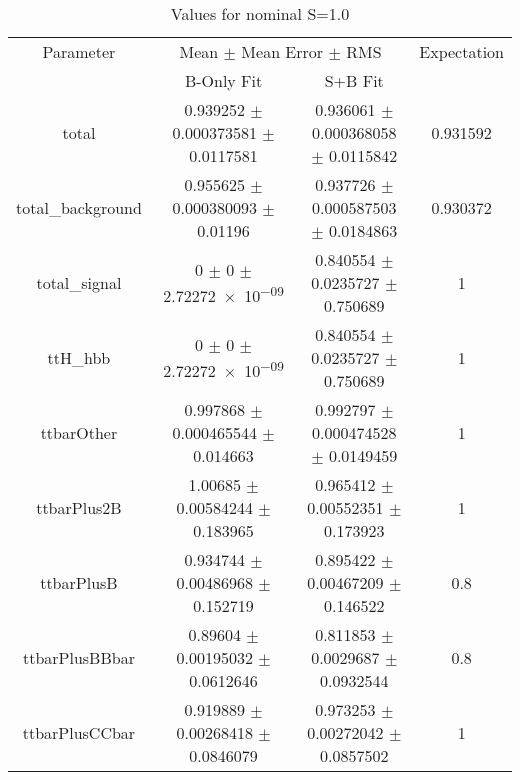 \begin{table}
\centering
\caption{Values for nominal S=1.0}
\begin{tabular}{cccc}
\toprule
Parameter & \multicolumn{2}{c}{Mean $\pm$ Mean Error $\pm$ RMS} & Expectation\\
 & B-Only Fit & S+B Fit & \\
\midrule
total & \num{0.939252} $\pm$ \num{0.000373581} $\pm$ \num{0.0117581} & \num{0.936061} $\pm$ \num{0.000368058} $\pm$ \num{0.0115842} & \num{0.931592}\\
total\_background & \num{0.955625} $\pm$ \num{0.000380093} $\pm$ \num{0.01196} & \num{0.937726} $\pm$ \num{0.000587503} $\pm$ \num{0.0184863} & \num{0.930372}\\
total\_signal & \num{0} $\pm$ \num{0} $\pm$ \num{2.72272e-09} & \num{0.840554} $\pm$ \num{0.0235727} $\pm$ \num{0.750689} & \num{1}\\
ttH\_hbb & \num{0} $\pm$ \num{0} $\pm$ \num{2.72272e-09} & \num{0.840554} $\pm$ \num{0.0235727} $\pm$ \num{0.750689} & \num{1}\\
ttbarOther & \num{0.997868} $\pm$ \num{0.000465544} $\pm$ \num{0.014663} & \num{0.992797} $\pm$ \num{0.000474528} $\pm$ \num{0.0149459} & \num{1}\\
ttbarPlus2B & \num{1.00685} $\pm$ \num{0.00584244} $\pm$ \num{0.183965} & \num{0.965412} $\pm$ \num{0.00552351} $\pm$ \num{0.173923} & \num{1}\\
ttbarPlusB & \num{0.934744} $\pm$ \num{0.00486968} $\pm$ \num{0.152719} & \num{0.895422} $\pm$ \num{0.00467209} $\pm$ \num{0.146522} & \num{0.8}\\
ttbarPlusBBbar & \num{0.89604} $\pm$ \num{0.00195032} $\pm$ \num{0.0612646} & \num{0.811853} $\pm$ \num{0.0029687} $\pm$ \num{0.0932544} & \num{0.8}\\
ttbarPlusCCbar & \num{0.919889} $\pm$ \num{0.00268418} $\pm$ \num{0.0846079} & \num{0.973253} $\pm$ \num{0.00272042} $\pm$ \num{0.0857502} & \num{1}\\
\bottomrule
\end{tabular}
\end{table}
